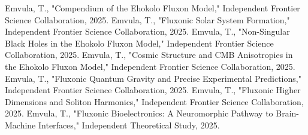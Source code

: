 \documentclass[11pt]{article}
\begin{document}



\begin{thebibliography}{9}
Emvula, T., "Compendium of the Ehokolo Fluxon Model," Independent Frontier Science Collaboration, 2025.
Emvula, T., "Fluxonic Solar System Formation," Independent Frontier Science Collaboration, 2025.
Emvula, T., "Non-Singular Black Holes in the Ehokolo Fluxon Model," Independent Frontier Science Collaboration, 2025.
Emvula, T., "Cosmic Structure and CMB Anisotropies in the Ehokolo Fluxon Model," Independent Frontier Science Collaboration, 2025.
Emvula, T., "Fluxonic Quantum Gravity and Precise Experimental Predictions," Independent Frontier Science Collaboration, 2025.
Emvula, T., "Fluxonic Higher Dimensions and Soliton Harmonics," Independent Frontier Science Collaboration, 2025.
Emvula, T., "Fluxonic Bioelectronics: A Neuromorphic Pathway to Brain-Machine Interfaces," Independent Theoretical Study, 2025.
\end{thebibliography}
\end{document}
